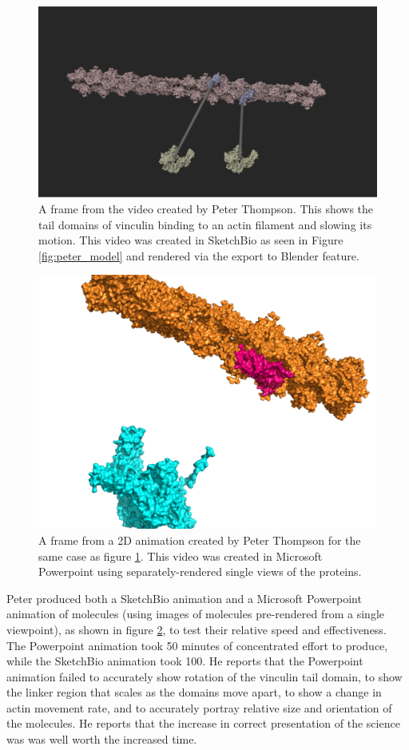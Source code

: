 \documentclass[twocolumn]{bmcart}%
\begin{document}
\begin{figure}[h!]
\centering
\includegraphics[width=0.9\columnwidth]{peter_video.png}
\caption{A frame from the video created by Peter Thompson.  This shows the tail domains of vinculin binding to an actin filament and slowing its motion.
This video was created in SketchBio as seen in Figure \ref{fig:peter_model} and rendered via the export to Blender feature.}
\label{fig:peter_video}
\end{figure}

\begin{figure}[h!]
\centering
\includegraphics[width=0.9\columnwidth]{peter_powerpoint_animation.png}
\caption{A frame from a 2D animation created by Peter Thompson for the same case as figure \ref{fig:peter_video}.
This video was created in Microsoft Powerpoint using separately-rendered single views of the proteins.}
\label{fig:peter_powerpoint}
\end{figure}

Peter produced both a SketchBio animation and a Microsoft Powerpoint animation of molecules (using images of molecules pre-rendered from a single viewpoint), as shown in figure \ref{fig:peter_powerpoint}, to test their relative speed and effectiveness.
The Powerpoint animation took 50 minutes of concentrated effort to produce, while the SketchBio animation took 100. He reports that the Powerpoint animation failed to accurately show rotation of the vinculin tail domain, to show the linker region that scales as the domains move apart, to show a change in actin movement rate, and to accurately portray relative size and orientation of the molecules.  He reports that the increase in correct presentation of the science was was well worth the increased time.
\end{document}
